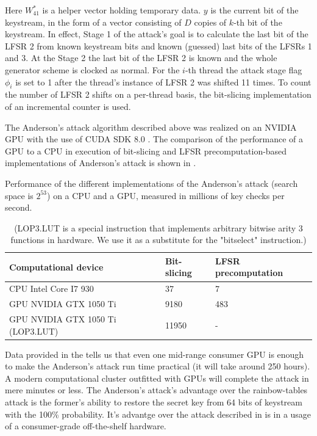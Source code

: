 \documentclass[runningheads,a4paper]{llncs}[2015/06/24]
\begin{document}
Here $W^\ast_{41}$ is a helper vector holding temporary data. $y$ is the
current bit of the keystream, in the form of a vector consisting of $D$ copies
of $k$-th bit of the keystream. In effect, Stage 1 of the attack's goal is to
calculate the last bit of the LFSR 2 from known keystream bits and known
(guessed) last bits of the LFSRs 1 and 3. At the Stage 2 the last bit of the
LFSR 2 is known and the whole generator scheme is clocked as normal. For the
$i$-th thread the attack stage flag $\phi_i$ is set to 1 after the thread's
instance of LFSR 2 was shifted 11 times. To count the number of LFSR 2 shifts
on a per-thread basis, the bit-slicing implementation of an incremental counter
is used.

The Anderson's attack algorithm described above was realized on an NVIDIA GPU
with the use of CUDA SDK 8.0 \cite{CUDA}. The comparison of the performance of
a GPU to a CPU in execution of bit-slicing and LFSR precomputation-based
\cite{DBLP:conf/fse/BiryukovSW00} implementations of Anderson's attack is shown in
\cite{tab:gpuspeed}.

\begin{table} \caption{(LOP3.LUT is a special instruction that implements
	arbitrary bitwise arity 3 functions in hardware. We use it as a substitute
	for the "bitselect" instruction.)} 
	\label{tab:gpuspeed} Performance of the different implementations of the
	Anderson's attack (search space is $2^{53}$) on a CPU and a GPU, measured
	in millions of key checks per second.  
	\begin {center} 
	\begin{tabular} {| l | l | l |} \hline Computational device & Bit-slicing &
		LFSR precomputation \cite{DBLP:conf/fse/BiryukovSW00} \\ \hline CPU Intel Core I7 930 & 37 & 7
		\\ \hline GPU NVIDIA GTX 1050 Ti & 9180 & 483 \\ \hline GPU NVIDIA GTX
		1050 Ti (LOP3.LUT) & 11950 & - \\ \hline
	\end{tabular}
\end {center}
\end{table}

Data provided in the  tells us that even one mid-range
consumer GPU is enough to make the Anderson's attack run time practical (it
will take around 250 hours). A modern computational cluster outfitted with GPUs
will complete the attack in mere minutes or less. The Anderson's attack's
advantage over the rainbow-tables attack \cite{RAINBOW} is the former's ability
to restore the secret key from 64 bits of keystream with the 100\% probability.
It's advantge over the attack described in \cite{COPAC_1} is in a usage of a
consumer-grade off-the-shelf hardware.
\end{document}
